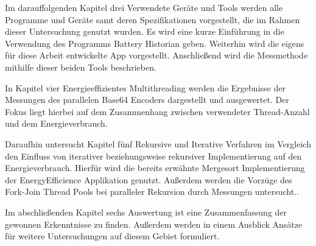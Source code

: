 Im darauffolgenden Kapitel drei \glqq Verwendete Geräte und Tools\grqq{} werden alle Programme und Geräte samt deren Spezifikationen vorgestellt, die im Rahmen dieser Untersuchung genutzt wurden. Es wird eine kurze Einführung in die Verwendung des Programms Battery Historian geben. Weiterhin wird die eigens für diese Arbeit entwickelte App vorgestellt. Anschließend wird die Messmethode mithilfe dieser beiden Tools beschrieben.

In Kapitel vier \glqq Energieeffizientes Multithreading\grqq{} werden die Ergebnisse der Messungen des parallelen Base64 Encoders dargestellt und ausgewertet. Der Fokus liegt hierbei auf dem Zusammenhang zwischen verwendeter Thread-Anzahl und dem Energieverbrauch.

Daraufhin untersucht Kapitel fünf \glqq Rekursive und Iterative Verfahren im Vergleich\grqq{} den Einfluss von iterativer beziehungsweise rekursiver Implementierung auf den Energieverbrauch. Hierfür wird die bereits erwähnte Mergesort Implementierung der \glqq EnergyEfficience\grqq{} Applikation genutzt. Außerdem werden die Vorzüge des Fork-Join Thread Pools bei paralleler Rekursion durch Messungen untersucht..

Im abschließenden Kapitel sechs \glqq Auswertung\grqq{} ist eine Zusammenfassung der gewonnen Erkenntnisse zu finden. Außerdem werden in einem Ausblick Ansätze für weitere Untersuchungen auf diesem Gebiet formuliert.

